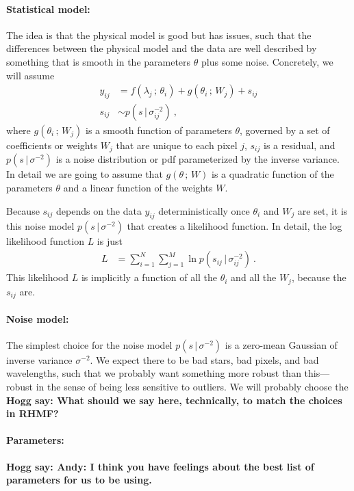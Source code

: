 \documentclass{article}
\newcommand{\semicolon}{\,;\,}
\newcommand{\given}{\,|\,}
\newcommand{\hogg}[1]{\textbf{\color{blue} Hogg say: #1}}
\begin{document}
\paragraph{Statistical model:}
The idea is that the physical model is good but has issues, such that the differences between the physical model and the data are well described by something that is smooth in the parameters $\theta$ plus some noise.
Concretely, we will assume
\begin{align}
    y_{ij} &= f(\lambda_j\semicolon\theta_i) + g(\theta_i\semicolon W_j) + s_{ij} \\
    s_{ij} &\sim p(s\given\sigma^{-2}_{ij}) ~,
\end{align}
where $g(\theta_i\semicolon W_j)$ is a smooth function of parameters $\theta$, governed by a set of coefficients or weights $W_{j}$ that are unique to each pixel $j$,
$s_{ij}$ is a residual,
and $p(s\given\sigma^{-2})$ is a noise distribution or pdf parameterized by the inverse variance.
In detail we are going to assume that $g(\theta\semicolon W)$ is a quadratic function of the parameters $\theta$ and a linear function of the weights $W$.

Because $s_{ij}$ depends on the data $y_{ij}$ deterministically once $\theta_i$ and $W_j$ are set, it is this noise model $p(s\given\sigma^{-2})$ that creates a likelihood function.
In detail, the log likelihood function $L$ is just
\begin{align}
    L &= \sum_{i=1}^N\sum_{j=1}^M \ln p(s_{ij}\given\sigma^{-2}_{ij}) ~.
\end{align}
This likelihood $L$ is implicitly a function of all the $\theta_i$ and all the $W_j$, because the $s_{ij}$ are.

\paragraph{Noise model:}
The simplest choice for the noise model $p(s\given\sigma^{-2})$ is a zero-mean Gaussian of inverse variance $\sigma^{-2}$.
We expect there to be bad stars, bad pixels, and bad wavelengths, such that we probably want something more robust than this---robust in the sense of being less sensitive to outliers.
We will probably choose the \hogg{What should we say here, technically, to match the choices in RHMF?}

\paragraph{Parameters:}
\hogg{Andy: I think you have feelings about the best list of parameters for us to be using.}
\end{document}
